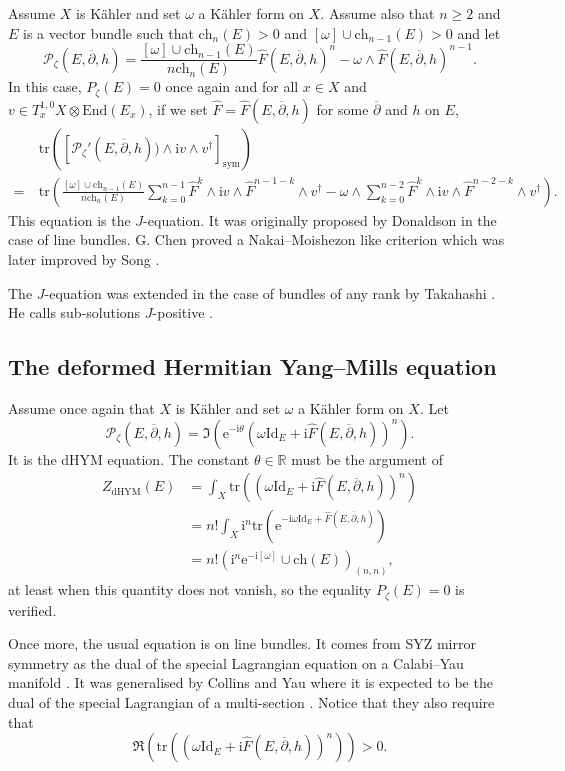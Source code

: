 \documentclass{article}
\theoremstyle{remark}
\theoremstyle{definition}
\newcommand{\R}{\mathbb{R}}
\newcommand{\End}{\mathrm{End}}
\newcommand{\tr}{\mathrm{tr}}
\newcommand{\Id}{\mathrm{Id}}
\renewcommand{\i}{\boldsymbol{\mathrm{i}}}
\newcommand{\e}{\boldsymbol{\mathrm{e}}}
\newcommand{\mP}{\mathcal{P}}
\newcommand{\dbar}{\overline{\partial}}
\newcommand{\ch}{\mathrm{ch}}
\newcommand{\sym}{\mathrm{sym}}
\renewcommand{\geq}{\geqslant}
\begin{document}
Assume $X$ is Kähler and set $\omega$ a Kähler form on $X$. Assume also that $n \geq 2$ and $E$ is a vector bundle such that $\ch_n(E) > 0$ and $[\omega] \cup \ch_{n - 1}(E) > 0$ and let
$$
\mP_\zeta(E,\dbar,h) = \frac{[\omega] \cup \ch_{n - 1}(E)}{n\ch_n(E)}\hat{F}(E,\dbar,h)^n - \omega \wedge \hat{F}(E,\dbar,h)^{n - 1}.
$$
In this case, $P_\zeta(E) = 0$ once again and for all $x \in X$ and $v \in T_x^{1,0}X \otimes \End(E_x)$, if we set $\hat{F} = \hat{F}(E,\dbar,h)$ for some $\dbar$ and $h$ on $E$,
\begin{align*}
    & \tr([\mP_\zeta'(E,\dbar,h)) \wedge \i v \wedge v^\dagger]_\sym)\\
    =\ & \tr\left(\frac{[\omega] \cup \ch_{n - 1}(E)}{n\ch_n(E)}\sum_{k = 0}^{n - 1} \hat{F}^k \wedge \i v \wedge \hat{F}^{n - 1 - k} \wedge v^\dagger - \omega \wedge \sum_{k = 0}^{n - 2} \hat{F}^k \wedge \i v \wedge \hat{F}^{n - 2 - k} \wedge v^\dagger\right).
\end{align*}
This equation is the $J$-equation. It was originally proposed by Donaldson \cite{Donaldson_J_eq} in the case of line bundles. G. Chen proved a Nakai--Moishezon like criterion \cite[Theorem 1.1]{Chen} which was later improved by Song \cite[Corollary 1.2]{Song}.

The $J$-equation was extended in the case of bundles of any rank by Takahashi \cite{Takahashi}. He calls sub-solutions $J$-positive \cite[Definition 3.1]{Takahashi}.

\subsection{The deformed Hermitian Yang--Mills equation}

Assume once again that $X$ is Kähler and set $\omega$ a Kähler form on $X$. Let
$$
\mP_\zeta(E,\dbar,h) = \Im(\e^{-\i\theta}(\omega\Id_E + \i\hat{F}(E,\dbar,h))^n).
$$
It is the dHYM equation. The constant $\theta \in \R$ must be the argument of
\begin{align*}
    Z_{\mathrm{dHYM}}(E) & = \int_X \tr((\omega\Id_E + \i\hat{F}(E,\dbar,h))^n)\\
    & = n!\int_X \i^n\tr(\e^{-\i\omega\Id_E + \hat{F}(E,\dbar,h)})\\
    & = n!\left(\i^n\e^{-\i[\omega]} \cup \ch(E)\right)_{(n,n)},
\end{align*}
at least when this quantity does not vanish, so the equality $P_\zeta(E) = 0$ is verified.

Once more, the usual equation is on line bundles. It comes from SYZ mirror symmetry as the dual of the special Lagrangian equation on a Calabi--Yau manifold \cite{LYZ,MMMS}. It was generalised by Collins and Yau \cite[Paragraph 8.1]{Collins_Yau_2018} where it is expected to be the dual of the special Lagrangian of a multi-section \cite{MMMS,LYZ,Minasian_Tomasiello,Grange_Minasian}. Notice that they also require that
$$
\Re(\tr((\omega\Id_E + \i\hat{F}(E,\dbar,h))^n)) > 0.
$$
\end{document}

